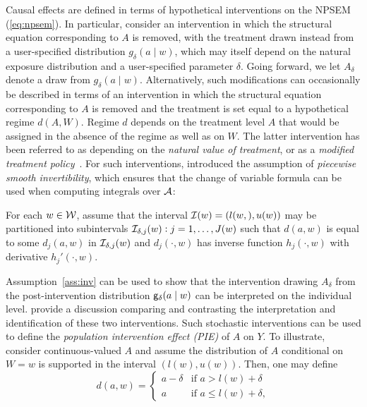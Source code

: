 Causal effects are defined in terms of hypothetical interventions on the NPSEM
(\ref{eq:npsem}). In particular, consider an intervention in which the
structural equation corresponding to $A$ is removed, with the treatment drawn
instead from a user-specified distribution $g_\delta(a \mid w)$, which may
itself depend on the natural exposure distribution and a user-specified
parameter $\delta$. Going forward, we let $A_\delta$ denote a draw from
$g_\delta(a \mid w)$. Alternatively, such modifications can occasionally be
described in terms of an intervention in which the structural equation
corresponding to $A$ is removed and the treatment is set equal to a hypothetical
regime $d(A, W)$. Regime $d$ depends on the treatment level $A$ that would be
assigned in the absence of the regime as well as on $W$. The latter intervention
has been referred to as depending on the \textit{natural value of treatment}, or
as a \textit{modified treatment policy}~\citep{haneuse2013estimation}. For such
interventions, \citet{haneuse2013estimation} introduced the assumption of
\textit{piecewise smooth invertibility}, which ensures that the change of
variable formula can be used when computing integrals over $\cal A$:
\begin{assumptioniden}\label{ass:inv}
  For each $w \in \cal W$, assume that the interval
  ${\cal I}(w) = (l(w,), u(w))$ may be partitioned into subintervals
  ${\cal I}_{\delta,j}(w):j = 1, \ldots, J(w)$ such that $d(a, w)$ is equal to
  some $d_j(a, w)$ in ${\cal I}_{\delta,j}(w)$ and $d_j(\cdot,w)$ has inverse
  function $h_j(\cdot, w)$ with derivative $h_j'(\cdot, w)$.
\end{assumptioniden}
Assumption~\ref{ass:inv} can be used to show that the intervention drawing
$A_{\delta}$ from the post-intervention distribution $\mathsf{g}_\delta(a \mid w)$ can
be interpreted on the individual level. \citet{young2014identification} provide
a discussion comparing and contrasting the interpretation and identification of
these two interventions. Such stochastic interventions can be used to define the
\textit{population intervention effect (PIE)} of $A$ on $Y$. To illustrate,
consider continuous-valued $A$ and assume the distribution of $A$ conditional on
$W = w$ is supported in the interval $(l(w), u(w))$. Then, one may define
\begin{equation}\label{eq:defdshift}
  d(a, w) =
  \begin{cases}
    a - \delta & \text{if } a > l(w) + \delta \\
    a & \text{if } a \leq l(w) + \delta,
  \end{cases}
\end{equation}

